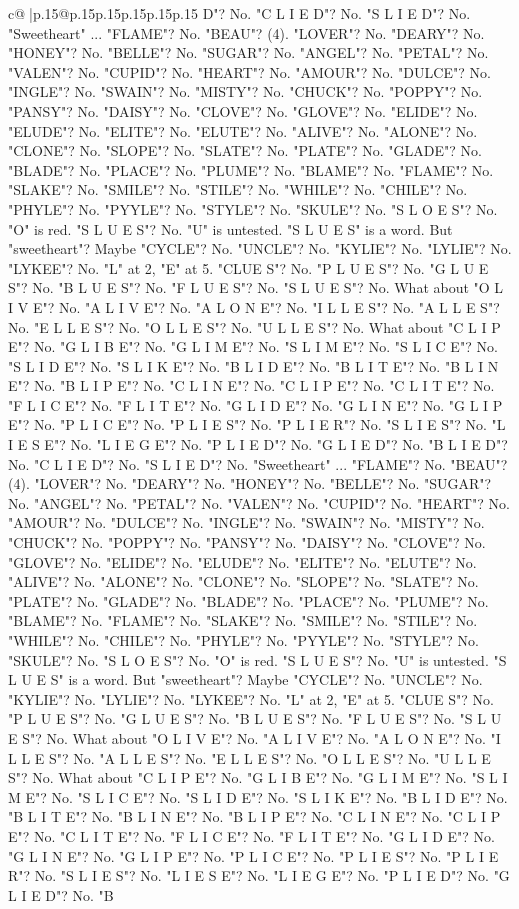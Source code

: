 \documentclass{article}
\begin{document}
{\begin{supertabular}{c@{$\;$}|p{.15\linewidth}@{}p{.15\linewidth}p{.15\linewidth}p{.15\linewidth}p{.15\linewidth}p{.15\linewidth}}
{{{D"? No. "C L I E D"? No. "S L I E D"? No. "Sweetheart" ... "FLAME"? No. "BEAU"? (4). "LOVER"? No. "DEARY"? No. "HONEY"? No. "BELLE"? No. "SUGAR"? No. "ANGEL"? No. "PETAL"? No. "VALEN"? No. "CUPID"? No. "HEART"? No. "AMOUR"? No. "DULCE"? No. "INGLE"? No. "SWAIN"? No. "MISTY"? No. "CHUCK"? No. "POPPY"? No. "PANSY"? No. "DAISY"? No. "CLOVE"? No. "GLOVE"? No. "ELIDE"? No. "ELUDE"? No. "ELITE"? No. "ELUTE"? No. "ALIVE"? No. "ALONE"? No. "CLONE"? No. "SLOPE"? No. "SLATE"? No. "PLATE"? No. "GLADE"? No. "BLADE"? No. "PLACE"? No. "PLUME"? No. "BLAME"? No. "FLAME"? No. "SLAKE"? No. "SMILE"? No. "STILE"? No. "WHILE"? No. "CHILE"? No. "PHYLE"? No. "PYYLE"? No. "STYLE"? No. "SKULE"? No. "S L O E S"? No. "O" is red. "S L U E S"? No. "U" is untested. "S L U E S" is a word. But "sweetheart"? Maybe "CYCLE"? No. "UNCLE"? No. "KYLIE"? No. "LYLIE"? No. "LYKEE"? No. "L" at 2, "E" at 5. "CLUE S"? No. "P L U E S"? No. "G L U E S"? No. "B L U E S"? No. "F L U E S"? No. "S L U E S"? No. What about "O L I V E"? No. "A L I V E"? No. "A L O N E"? No. "I L L E S"? No. "A L L E S"? No. "E L L E S"? No. "O L L E S"? No. "U L L E S"? No. What about "C L I P E"? No. "G L I B E"? No. "G L I M E"? No. "S L I M E"? No. "S L I C E"? No. "S L I D E"? No. "S L I K E"? No. "B L I D E"? No. "B L I T E"? No. "B L I N E"? No. "B L I P E"? No. "C L I N E"? No. "C L I P E"? No. "C L I T E"? No. "F L I C E"? No. "F L I T E"? No. "G L I D E"? No. "G L I N E"? No. "G L I P E"? No. "P L I C E"? No. "P L I E S"? No. "P L I E R"? No. "S L I E S"? No. "L I E S E"? No. "L I E G E"? No. "P L I E D"? No. "G L I E D"? No. "B L I E D"? No. "C L I E D"? No. "S L I E D"? No. "Sweetheart" ... "FLAME"? No. "BEAU"? (4). "LOVER"? No. "DEARY"? No. "HONEY"? No. "BELLE"? No. "SUGAR"? No. "ANGEL"? No. "PETAL"? No. "VALEN"? No. "CUPID"? No. "HEART"? No. "AMOUR"? No. "DULCE"? No. "INGLE"? No. "SWAIN"? No. "MISTY"? No. "CHUCK"? No. "POPPY"? No. "PANSY"? No. "DAISY"? No. "CLOVE"? No. "GLOVE"? No. "ELIDE"? No. "ELUDE"? No. "ELITE"? No. "ELUTE"? No. "ALIVE"? No. "ALONE"? No. "CLONE"? No. "SLOPE"? No. "SLATE"? No. "PLATE"? No. "GLADE"? No. "BLADE"? No. "PLACE"? No. "PLUME"? No. "BLAME"? No. "FLAME"? No. "SLAKE"? No. "SMILE"? No. "STILE"? No. "WHILE"? No. "CHILE"? No. "PHYLE"? No. "PYYLE"? No. "STYLE"? No. "SKULE"? No. "S L O E S"? No. "O" is red. "S L U E S"? No. "U" is untested. "S L U E S" is a word. But "sweetheart"? Maybe "CYCLE"? No. "UNCLE"? No. "KYLIE"? No. "LYLIE"? No. "LYKEE"? No. "L" at 2, "E" at 5. "CLUE S"? No. "P L U E S"? No. "G L U E S"? No. "B L U E S"? No. "F L U E S"? No. "S L U E S"? No. What about "O L I V E"? No. "A L I V E"? No. "A L O N E"? No. "I L L E S"? No. "A L L E S"? No. "E L L E S"? No. "O L L E S"? No. "U L L E S"? No. What about "C L I P E"? No. "G L I B E"? No. "G L I M E"? No. "S L I M E"? No. "S L I C E"? No. "S L I D E"? No. "S L I K E"? No. "B L I D E"? No. "B L I T E"? No. "B L I N E"? No. "B L I P E"? No. "C L I N E"? No. "C L I P E"? No. "C L I T E"? No. "F L I C E"? No. "F L I T E"? No. "G L I D E"? No. "G L I N E"? No. "G L I P E"? No. "P L I C E"? No. "P L I E S"? No. "P L I E R"? No. "S L I E S"? No. "L I E S E"? No. "L I E G E"? No. "P L I E D"? No. "G L I E D"? No. "B }}}
\end{supertabular}}
\end{document}
